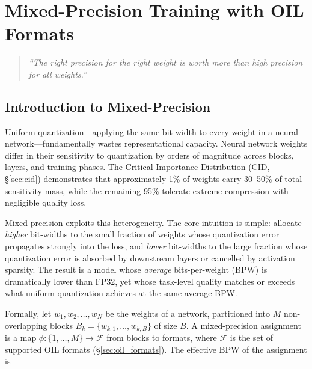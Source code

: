 
\chapter{Mixed-Precision Training with OIL Formats}
\label{ch:mixed_precision}

\begin{quote}
\textit{``The right precision for the right weight is worth more than high precision for all weights.''}
\end{quote}

\section{Introduction to Mixed-Precision}
\label{sec:mix_intro}

Uniform quantization---applying the same bit-width to every weight in a
neural network---fundamentally wastes representational capacity.  Neural
network weights differ in their sensitivity to quantization by orders of
magnitude across blocks, layers, and training phases.  The Critical
Importance Distribution (CID, \S\ref{sec:cid}) demonstrates that
approximately 1\% of weights carry 30--50\% of total sensitivity mass,
while the remaining 95\% tolerate extreme compression with negligible
quality loss.

Mixed precision exploits this heterogeneity.  The core intuition is
simple: allocate \emph{higher} bit-widths to the small fraction of
weights whose quantization error propagates strongly into the loss, and
\emph{lower} bit-widths to the large fraction whose quantization error
is absorbed by downstream layers or cancelled by activation sparsity.
The result is a model whose \emph{average} bits-per-weight (BPW) is
dramatically lower than FP32, yet whose task-level quality matches or
exceeds what uniform quantization achieves at the same average BPW.

Formally, let $w_1, w_2, \ldots, w_N$ be the weights of a network,
partitioned into $M$ non-overlapping blocks
$B_k = \{w_{k,1}, \ldots, w_{k,B}\}$ of size $B$.  A mixed-precision
assignment is a map $\phi : \{1, \ldots, M\} \to \mathcal{F}$ from
blocks to formats, where $\mathcal{F}$ is the set of supported OIL
formats (\S\ref{sec:oil_formats}).  The effective BPW of the assignment
is

